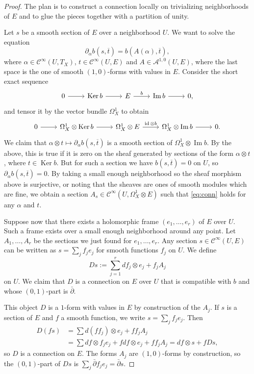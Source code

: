 \documentclass[10pt,a4paper]{amsart}
\theoremstyle{definition}
\newcommand{\cc}[1]{\mathcal{#1}}
\def\ov#1{\overline{#1}}
\DeclareMathOperator{\im}{Im}
\DeclareMathOperator{\Ker}{Ker}
\DeclareMathOperator{\id}{id}
\begin{document}
\begin{proof}
The plan is to construct a connection locally on trivializing neighborhoods of $E$ and to glue the pieces together with a partition of unity.

Let $s$ be a smooth section of $E$ over a neighborhood $U$. We want to solve the equation
\begin{equation}
\label{eq:conn}
\partial_\alpha b(s, \ov t)
= b(A(\alpha), \ov t),
\end{equation}
where $\alpha \in \cc C^\infty(U, T_X)$, $t \in \cc C^\infty(U, E)$ and $A \in \cc A^{1,0}(U, E)$, where the last space is the one of smooth $(1,0)$-forms with values in $E$. Consider the short exact sequence
\[
\begin{tikzcd}
0 \ar[r] &
\Ker b \ar[r] &
E \ar[r,"b"] &
\im b \ar[r] &
0,
\end{tikzcd}
\]
and tensor it by the vector bundle $\Omega^1_X$ to obtain
\[
\begin{tikzcd}
0 \ar[r] &
\Omega^1_X \otimes \Ker b \ar[r] &
\Omega^1_X \otimes E \ar[r,"\id \otimes b"] &
\Omega^1_X \otimes \im b \ar[r] &
0.
\end{tikzcd}
\]
We claim that $\alpha \otimes t \mapsto \partial_\alpha b(s, \ov t)$ is a smooth section of $\Omega^1_X \otimes \im b$. By the above, this is true if it is zero on the sheaf generated by sections of the form $\alpha \otimes t$, where $t \in \Ker b$. But for such a section we have $b(s, \ov t) = 0$ on $U$, so $\partial_\alpha b(s, \ov t) = 0$. By taking a small enough neighborhood so the sheaf morphism above is surjective, or noting that the sheaves are ones of smooth modules which are fine, we obtain a section $A_s \in \cc C^\infty(U, \Omega_X^1 \otimes E)$ such that \eqref{eq:conn} holds for any $\alpha$ and $t$.

Suppose now that there exists a holomorphic frame $(e_1, \ldots, e_r)$ of $E$ over $U$. Such a frame exists over a small enough neighborhood around any point. Let $A_1, \ldots, A_r$ be the sections we just found for $e_1, \ldots, e_r$. Any section $s \in \cc C^\infty(U, E)$ can be written as $s = \sum_j f_j e_j$ for smooth functions $f_j$ on $U$. We define
\[
D s := \sum_{j=1}^r df_j \otimes e_j + f_j A_j
\]
on $U$. We claim that $D$ is a connection on $E$ over $U$ that is compatible with $b$ and whose $(0,1)$-part is $\bar\partial$.

This object $D$ is a $1$-form with values in $E$ by construction of the $A_j$. If $s$ is a section of $E$ and $f$ a smooth function, we write $s = \sum_j f_j e_j$. Then
\begin{align*}
D(fs)
&= \sum d(f f_j) \otimes e_j + f f_j A_j
\\
&= \sum df \otimes f_j e_j + f df \otimes e_j + f f_j A_j
= df \otimes s + f Ds,
\end{align*}
so $D$ is a connection on $E$. The forms $A_j$ are $(1,0)$-forms by construction, so the $(0,1)$-part of $Ds$ is $\sum_j \bar\partial f_j e_j = \bar\partial s$.


\end{proof}
\end{document}
